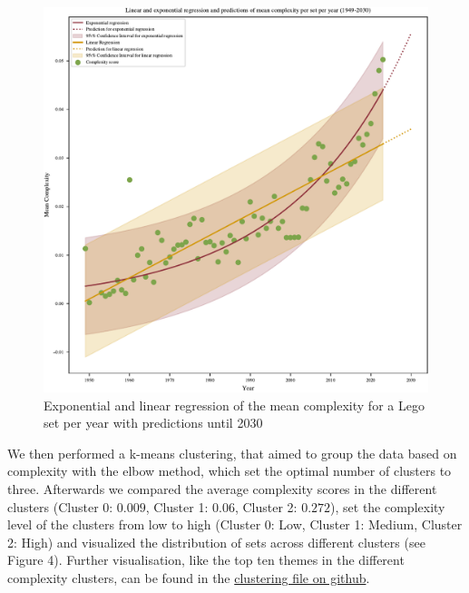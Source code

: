\documentclass{article}
\theoremstyle{plain}
\theoremstyle{definition}
\theoremstyle{remark}
\begin{document}
\begin{figure}[ht]
 \vskip 0.2in
 \begin{center}
 \centerline{\includegraphics[width=\columnwidth]{Images/Regressions.pdf}}
\caption{Exponential and linear regression of the mean complexity for a Lego set per year with predictions until 2030}
\label{icml-historical}
 \end{center}
 \vskip -0.2in
\end{figure}

We then performed a k-means clustering, that aimed to group the data based on complexity with the elbow method, which set the optimal number of clusters to three. Afterwards we compared the average complexity scores in the different clusters (Cluster 0: $0.009$, Cluster 1: $0.06$, Cluster 2: $0.272$), set the complexity level of the clusters from low to high (Cluster 0: Low, Cluster 1: Medium, Cluster 2: High) and visualized the distribution of sets across different clusters (see Figure 4). Further visualisation, like the top ten themes in the different complexity clusters, can be found in the \href{https://github.com/eddiebeach99/Data_Literacy/blob/main/Analysis/clustering.ipynb}{clustering file on github}.
\end{document}
